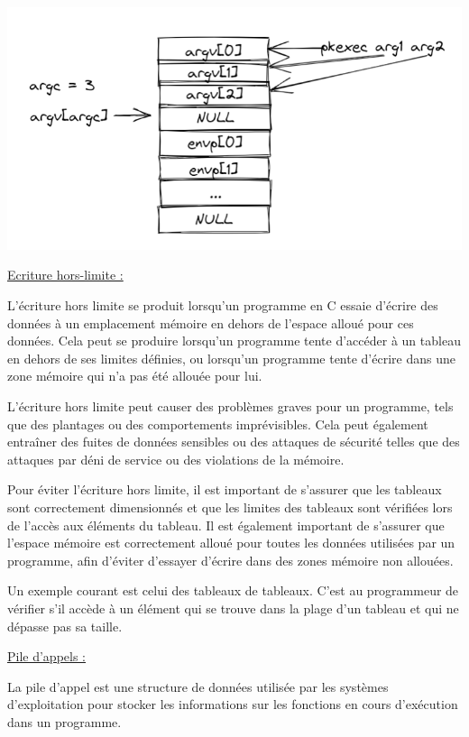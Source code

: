 \documentclass[12pt,a4paper]{article}
\begin{document}
\begin{flushleft}
                \begin{center}
                    \includegraphics[scale=0.6]{main}
                \end{center}
                \newpage
            \underline{Ecriture hors-limite : }
                \item L'écriture hors limite se produit lorsqu'un programme en C essaie d'écrire des données à un emplacement mémoire en dehors de l'espace alloué pour ces données. Cela peut se produire lorsqu'un programme tente d'accéder à un tableau en dehors de ses limites définies, ou lorsqu'un programme tente d'écrire dans une zone mémoire qui n'a pas été allouée pour lui.
                \item L'écriture hors limite peut causer des problèmes graves pour un programme, tels que des plantages ou des comportements imprévisibles. Cela peut également entraîner des fuites de données sensibles ou des attaques de sécurité telles que des attaques par déni de service ou des violations de la mémoire.
                \item Pour éviter l'écriture hors limite, il est important de s'assurer que les tableaux sont correctement dimensionnés et que les limites des tableaux sont vérifiées lors de l'accès aux éléments du tableau. Il est également important de s'assurer que l'espace mémoire est correctement alloué pour toutes les données utilisées par un programme, afin d'éviter d'essayer d'écrire dans des zones mémoire non allouées.
                \item Un exemple courant est celui des tableaux de tableaux. C’est au programmeur de vérifier s’il accède à un élément qui se trouve dans la plage d’un tableau et qui ne dépasse pas sa taille.
            \item \underline{Pile d’appels :}
                 \item La pile d'appel est une structure de données utilisée par les systèmes d'exploitation pour stocker les informations sur les fonctions en cours d'exécution dans un programme. 

\end{flushleft}
\end{document}
